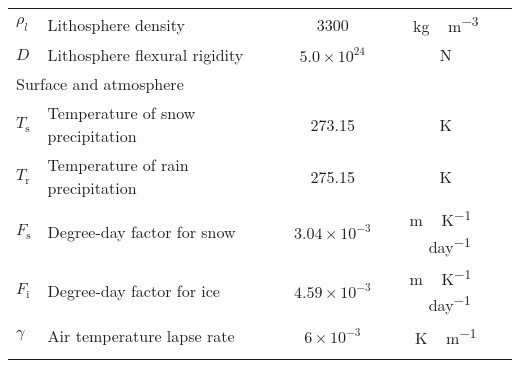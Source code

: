 \documentclass[tc, manuscript]{copernicus}
\begin{document}
\begin{table}[t]
{\begin{tabular}{llcc}
    $\rho_l$& Lithosphere density
            & 3300
            & \unit{kg\,m^{-3}} \\

    $D$     & Lithosphere flexural rigidity
            & $5.0\times10^{24}$
            & \unit{N} \\
    \cline{1-4}
    \multicolumn{2}{l}{{Surface and atmosphere}} \\
    \cline{1-4}
    $T_{\mathrm{s}}$   & Temperature of snow precipitation
            & 273.15
            & \unit{K} \\

    $T_{\mathrm{r}}$   & Temperature of rain precipitation
            & 275.15
            & \unit{K} \\

    $F_{\mathrm{s}}$   & Degree-day factor for snow
            & $3.04\times10^{-3}$
            & \unit{m\,K^{-1}\,day^{-1}} \\

    $F_{\mathrm{i}}$   & Degree-day factor for ice
            & $4.59\times10^{-3}$
            & \unit{m\,K^{-1}\,day^{-1}} \\

    $\gamma$& Air temperature lapse rate
            & $6\times10^{-3}$
            & \unit{K\,m^{-1}} \\
    \bottomhline
\end{tabular}}
\belowtable{%
}\label{tab:params}
\end{table}
\end{document}
